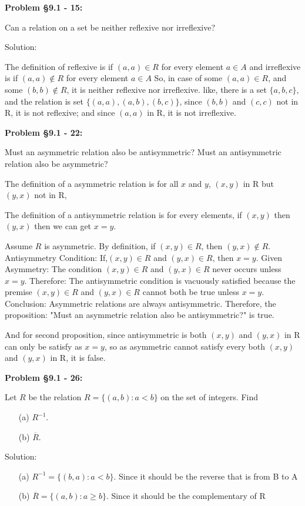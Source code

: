 \documentclass{article}
\newenvironment{problem}[1]
{\begin{mdframed}[default]
\textbf{Problem #1:}
}
{\end{mdframed}
}
\begin{document}
\begin{problem}{\S 9.1 - 15}
Can a relation on a set be neither reflexive nor irreflexive?

Solution:

The definition of reflexive is if $(a,a) \in R$ for every element $a \in A$
and irreflexive is if $(a,a) \notin R$ for every element $a \in A$
So, in case of some $(a,a)\in R$, and some $(b,b)\notin R$, it is neither reflexive nor irreflexive.
like, there is a set $\{a,b,c\}$, and the relation is set $\{(a,a), (a,b), (b,c)\}$, since $(b,b)$ and $(c,c)$ not in R, it is not reflexive; and since $(a,a)$ in R, it is not irreflexive.

\end{problem}
\begin{problem}{\S 9.1 - 22}
Must an asymmetric relation also be antisymmetric? Must an antisymmetric relation
also be asymmetric?

The definition of a asymmetric relation is for all $x$ and $y$, $(x,y)$ in R but $(y,x)$ not in R, 

The definition of a antisymmetric relation is for every elements, if $(x,y)$ then $(y,x)$ then we can get $x=y$.

Assume $R$ is asymmetric. By definition, if $(x,y)\in R$, then $(y,x)\notin R$. Antisymmetry Condition: If,$(x,y)\in R$ and $(y,x)\in R$, then $x=y$. Given Asymmetry: The condition $(x,y)\in R$ and $(y,x)\in R$ never occurs unless $x=y$. Therefore: The antisymmetric condition is vacuously satisfied because the premise $(x,y)\in R$ and $(y,x)\in R$ cannot both be true unless $x=y$.
Conclusion: Asymmetric relations are always antisymmetric. Therefore, the proposition: "Must an asymmetric relation also be antisymmetric?" is true.

And for second proposition, since antisymmetric is both $(x,y)$ and $(y,x)$ in R can only be satisfy as $x=y$, so as asymmetric cannot satisfy every both $(x,y)$ and $(y,x)$ in R, it is false.
\end{problem}
\begin{problem}{\S 9.1 - 26}
Let $R$ be the relation $R = \{ (a,b) : a < b \}$ on the set of integers. Find
\begin{itemize}
\item[(a)] $R^{-1}$.
\item[(b)] $\overline{R}$.
\end{itemize}
Solution:

\begin{itemize}
    \item[(a)] $R^{-1}=\{(b,a):a<b\}$. Since it should be the reverse that is from B to A
    \item[(b)] $\overline{R}=\{(a,b):a\geq b\}$. Since it should be the complementary of R
    \end{itemize}
\end{problem}
\end{document}
